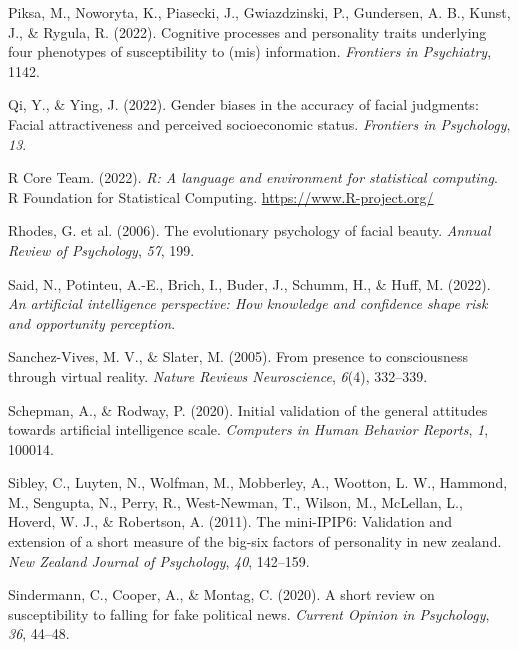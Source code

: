 \documentclass[
  man,mask,floatsintext]{apa6}
\newlength{\cslhangindent}
\newlength{\cslentryspacingunit} %
\newenvironment{CSLReferences}[2] %
 {%
  \setlength{\parindent}{0pt}
  \ifodd #1
  \let\oldpar\par
  \def\par{\hangindent=\cslhangindent\oldpar}
  \fi
  \setlength{\parskip}{#2\cslentryspacingunit}
 }%
 {}
\begin{document}
\begin{CSLReferences}{1}{0}
\leavevmode{}%
Piksa, M., Noworyta, K., Piasecki, J., Gwiazdzinski, P., Gundersen, A. B., Kunst, J., \& Rygula, R. (2022). Cognitive processes and personality traits underlying four phenotypes of susceptibility to (mis) information. \emph{Frontiers in Psychiatry}, 1142.

\leavevmode{}%
Qi, Y., \& Ying, J. (2022). Gender biases in the accuracy of facial judgments: Facial attractiveness and perceived socioeconomic status. \emph{Frontiers in Psychology}, \emph{13}.

\leavevmode{}%
R Core Team. (2022). \emph{R: A language and environment for statistical computing}. R Foundation for Statistical Computing. \url{https://www.R-project.org/}

\leavevmode{}%
Rhodes, G. et al. (2006). The evolutionary psychology of facial beauty. \emph{Annual Review of Psychology}, \emph{57}, 199.

\leavevmode{}%
Said, N., Potinteu, A.-E., Brich, I., Buder, J., Schumm, H., \& Huff, M. (2022). \emph{An artificial intelligence perspective: How knowledge and confidence shape risk and opportunity perception}.

\leavevmode{}%
Sanchez-Vives, M. V., \& Slater, M. (2005). From presence to consciousness through virtual reality. \emph{Nature Reviews Neuroscience}, \emph{6}(4), 332--339.

\leavevmode{}%
Schepman, A., \& Rodway, P. (2020). Initial validation of the general attitudes towards artificial intelligence scale. \emph{Computers in Human Behavior Reports}, \emph{1}, 100014.

\leavevmode{}%
Sibley, C., Luyten, N., Wolfman, M., Mobberley, A., Wootton, L. W., Hammond, M., Sengupta, N., Perry, R., West-Newman, T., Wilson, M., McLellan, L., Hoverd, W. J., \& Robertson, A. (2011). The mini-IPIP6: Validation and extension of a short measure of the big-six factors of personality in new zealand. \emph{New Zealand Journal of Psychology}, \emph{40}, 142--159.

\leavevmode{}%
Sindermann, C., Cooper, A., \& Montag, C. (2020). A short review on susceptibility to falling for fake political news. \emph{Current Opinion in Psychology}, \emph{36}, 44--48.


\end{CSLReferences}
\end{document}
